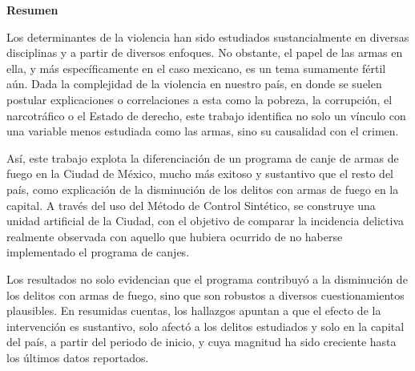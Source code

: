 \begin{titlepage}
	
	\vspace*{\fill}
	\begin{Huge}
		\textbf{Resumen} \\[0.3in]
	\end{Huge}
	
	\normalsize{Los determinantes de la violencia han sido estudiados sustancialmente en diversas disciplinas y a partir de diversos enfoques. No obstante, el papel de las armas en ella, y más específicamente en el caso mexicano, es un tema sumamente fértil aún. Dada la complejidad de la violencia en nuestro país, en donde se suelen postular explicaciones o correlaciones a esta como la pobreza, la corrupción, el narcotráfico o el Estado de derecho, este trabajo identifica no solo un vínculo con una variable menos estudiada como las armas, sino su causalidad con el crimen.
	
	Así, este trabajo explota la diferenciación de un programa de canje de armas de fuego en la Ciudad de México, mucho más exitoso y sustantivo que el resto del país, como explicación de la disminución de los delitos con armas de fuego en la capital. A través del uso del Método de Control Sintético, se construye una unidad artificial de la Ciudad, con el objetivo de comparar la incidencia delictiva realmente observada con aquello que hubiera ocurrido de no haberse implementado el programa de canjes.
	
	Los resultados no solo evidencian que el programa contribuyó a la disminución de los delitos con armas de fuego, sino que son robustos a diversos cuestionamientos plausibles. En resumidas cuentas, los hallazgos apuntan a que el efecto de la intervención es sustantivo, solo afectó a los delitos estudiados y solo en la capital del país, a partir del periodo de inicio, y cuya magnitud ha sido creciente hasta los últimos datos reportados.
	}
	\vspace*{\fill}
	
\end{titlepage}

\begin{titlepage}
	\
\end{titlepage}


